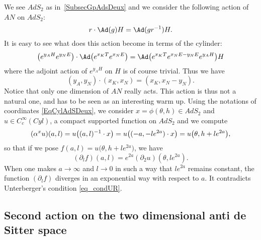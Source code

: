 We see $AdS_2$ as in~\ref{SubsecGpAdsDeux} and we consider the following action of $AN$ on $AdS_2$:
\[
	r\cdot\Ad(g)H=\Ad(gr^{-1})H.
\]
It is easy to see what does this action become in terms of the cylinder:
\[
	\big(  e^{y_AH} e^{y_NE} \big)\cdot \Ad\big(  e^{x_KT} e^{x_NE} \big)
	=\Ad\big(   e^{x_KT} e^{x_NE-y_NE} e^{y_AH}  \big)H
\]
where the adjoint action of $ e^{y_AH}$ on $H$ is of course trivial. Thus we have
\begin{equation}
	(y_A,y_N)\cdot (x_K,x_N)=(x_K,x_N-y_N).
\end{equation}
Notice that only one dimension of $AN$ really acts. This action is thus not a natural one, and has to be seen as an interesting warm up. Using the notations of coordinates \eqref{EqCylAdSDeux}, we consider $x=\phi(\theta,h)\in AdS_2$ and $u\in  C^{\infty}_c(Cyl)$, a compact supported function on $AdS_2$ and we compute
\[
	(\alpha^xu)(a,l)=u\big( (a,l)^{-1}\cdot x \big)\\
	=u\big( (-a,-l  e^{2a})\cdot x \big)\\
	=u\big( \theta,h+l e^{2a} \big),
\]
so that if we pose $f(a,l)=u\big( \theta,h+l e^{2a} \big)$, we have
\[
	(\partial_lf)(a,l)= e^{2a}(\partial_2u)(\theta,l e^{2a}).
\]
When one makes $a\to\infty$ and $l\to 0$ in such a way that $l e^{2a}$ remains constant, the function $(\partial_lf)$ diverges in an exponential way with respect to $a$. It contradicts Unterberger's condition \eqref{eq_condUR}.

\subsection{Second action on the two dimensional anti de Sitter space}

